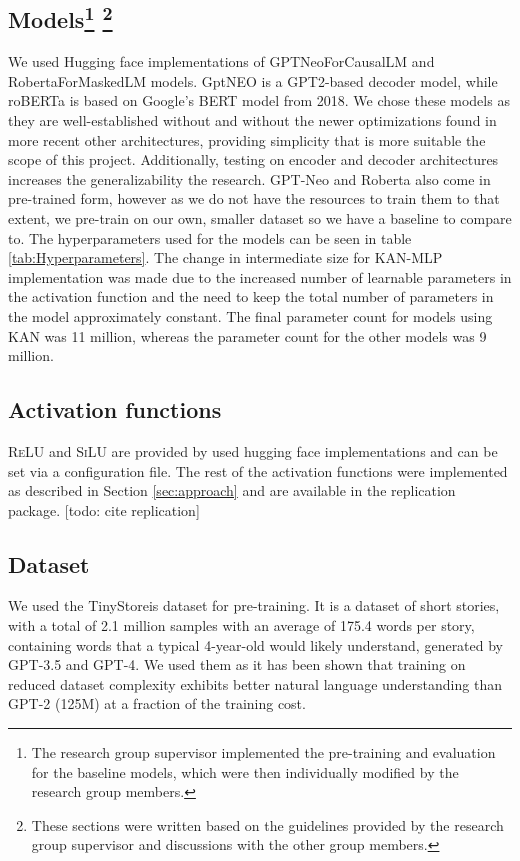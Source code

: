 \subsection{Models\protect\footnote{\label{footnote:code} The research group supervisor implemented the pre-training and evaluation for the baseline models, which were then individually modified by the research group members.} \protect\footnote{\label{footnote:text} These sections were written based on the guidelines provided by the research group supervisor and discussions with the other group members.}}
We used Hugging face implementations of GPTNeoForCausalLM \cite{huggingfaceNEO} and RobertaForMaskedLM \cite{huggingfaceRoberta} models. GptNEO is a GPT2-based decoder model, while roBERTa is based on Google's BERT model from 2018. We chose these models as they are well-established without and without the newer optimizations found in more recent other architectures, providing simplicity that is more suitable the scope of this project. Additionally, testing on encoder and decoder architectures increases the generalizability the research. GPT-Neo and Roberta also come in pre-trained form, however as we do not have the resources to train them to that extent, we pre-train on our own, smaller dataset so we have a baseline to compare to. The hyperparameters used for the models can be seen in table \ref{tab:Hyperparameters}. The change in intermediate size for KAN-MLP implementation was made due to the increased number of learnable parameters in the activation function and the need to keep the total number of parameters in the model approximately constant. The final parameter count for models using KAN was 11 million, whereas the parameter count for the other models was 9 million.

\subsection{Activation functions}
\textsc{ReLU} and \textsc{SiLU} are provided by used hugging face implementations and can be set via a configuration file. The rest of the activation functions were implemented as described in Section \ref{sec:approach} and are available in the replication package. [todo: cite replication]

\subsection{Dataset\protect\footnotemark[5]}
We used the TinyStoreis \cite{Eldan2023} dataset for pre-training. It is a dataset of short stories, with a total of 2.1 million samples with an average of 175.4 words per story, containing words that a typical 4-year-old would likely understand, generated by GPT-3.5 and GPT-4. We used them as it has been shown that training on reduced dataset complexity exhibits better natural language understanding than GPT-2 (125M) at a fraction of the training cost.

